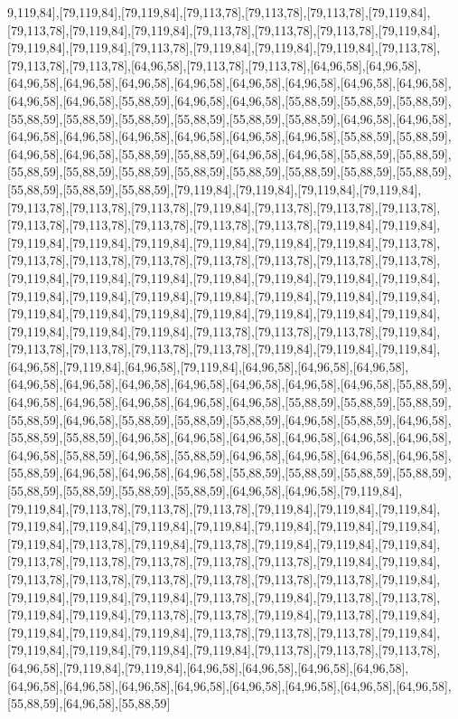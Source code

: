 9,119,84],[79,119,84],[79,119,84],[79,113,78],[79,113,78],[79,113,78],[79,119,84],[79,113,78],[79,119,84],[79,119,84],[79,113,78],[79,113,78],[79,113,78],[79,119,84],[79,119,84],[79,119,84],[79,113,78],[79,119,84],[79,119,84],[79,119,84],[79,113,78],[79,113,78],[79,113,78],[64,96,58],[79,113,78],[79,113,78],[64,96,58],[64,96,58],[64,96,58],[64,96,58],[64,96,58],[64,96,58],[64,96,58],[64,96,58],[64,96,58],[64,96,58],[64,96,58],[64,96,58],[55,88,59],[64,96,58],[64,96,58],[55,88,59],[55,88,59],[55,88,59],[55,88,59],[55,88,59],[55,88,59],[55,88,59],[55,88,59],[55,88,59],[64,96,58],[64,96,58],[64,96,58],[64,96,58],[64,96,58],[64,96,58],[64,96,58],[64,96,58],[55,88,59],[55,88,59],[64,96,58],[64,96,58],[55,88,59],[55,88,59],[64,96,58],[64,96,58],[55,88,59],[55,88,59],[55,88,59],[55,88,59],[55,88,59],[55,88,59],[55,88,59],[55,88,59],[55,88,59],[55,88,59],[55,88,59],[55,88,59],[55,88,59],[79,119,84],[79,119,84],[79,119,84],[79,119,84],[79,113,78],[79,113,78],[79,113,78],[79,119,84],[79,113,78],[79,113,78],[79,113,78],[79,113,78],[79,113,78],[79,113,78],[79,113,78],[79,113,78],[79,119,84],[79,119,84],[79,119,84],[79,119,84],[79,119,84],[79,119,84],[79,119,84],[79,119,84],[79,113,78],[79,113,78],[79,113,78],[79,113,78],[79,113,78],[79,113,78],[79,113,78],[79,113,78],[79,119,84],[79,119,84],[79,119,84],[79,119,84],[79,119,84],[79,119,84],[79,119,84],[79,119,84],[79,119,84],[79,119,84],[79,119,84],[79,119,84],[79,119,84],[79,119,84],[79,119,84],[79,119,84],[79,119,84],[79,119,84],[79,119,84],[79,119,84],[79,119,84],[79,119,84],[79,119,84],[79,119,84],[79,113,78],[79,113,78],[79,113,78],[79,119,84],[79,113,78],[79,113,78],[79,113,78],[79,113,78],[79,119,84],[79,119,84],[79,119,84],[64,96,58],[79,119,84],[64,96,58],[79,119,84],[64,96,58],[64,96,58],[64,96,58],[64,96,58],[64,96,58],[64,96,58],[64,96,58],[64,96,58],[64,96,58],[64,96,58],[55,88,59],[64,96,58],[64,96,58],[64,96,58],[64,96,58],[64,96,58],[55,88,59],[55,88,59],[55,88,59],[55,88,59],[64,96,58],[55,88,59],[55,88,59],[55,88,59],[64,96,58],[55,88,59],[64,96,58],[55,88,59],[55,88,59],[64,96,58],[64,96,58],[64,96,58],[64,96,58],[64,96,58],[64,96,58],[64,96,58],[55,88,59],[64,96,58],[55,88,59],[64,96,58],[64,96,58],[64,96,58],[64,96,58],[55,88,59],[64,96,58],[64,96,58],[64,96,58],[55,88,59],[55,88,59],[55,88,59],[55,88,59],[55,88,59],[55,88,59],[55,88,59],[55,88,59],[64,96,58],[64,96,58],[79,119,84],[79,119,84],[79,113,78],[79,113,78],[79,113,78],[79,119,84],[79,119,84],[79,119,84],[79,119,84],[79,119,84],[79,119,84],[79,119,84],[79,119,84],[79,119,84],[79,119,84],[79,119,84],[79,113,78],[79,119,84],[79,113,78],[79,119,84],[79,119,84],[79,119,84],[79,113,78],[79,113,78],[79,113,78],[79,113,78],[79,113,78],[79,119,84],[79,119,84],[79,113,78],[79,113,78],[79,113,78],[79,113,78],[79,113,78],[79,113,78],[79,119,84],[79,119,84],[79,119,84],[79,119,84],[79,113,78],[79,119,84],[79,113,78],[79,113,78],[79,119,84],[79,119,84],[79,113,78],[79,113,78],[79,119,84],[79,113,78],[79,119,84],[79,119,84],[79,119,84],[79,119,84],[79,113,78],[79,113,78],[79,113,78],[79,119,84],[79,119,84],[79,119,84],[79,119,84],[79,119,84],[79,113,78],[79,113,78],[79,113,78],[64,96,58],[79,119,84],[79,119,84],[64,96,58],[64,96,58],[64,96,58],[64,96,58],[64,96,58],[64,96,58],[64,96,58],[64,96,58],[64,96,58],[64,96,58],[64,96,58],[64,96,58],[55,88,59],[64,96,58],[55,88,59]